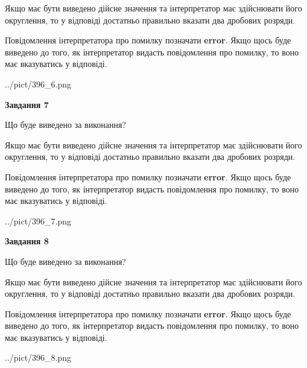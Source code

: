 \documentclass[12pt, ukrainian]{article}
\begin{document}
{\begin {Large}
Якщо має бути виведено дійсне значення та інтерпретатор має здійснювати його округлення, 
то у відповіді достатньо правильно вказати два дробових розряди.

Повідомлення інтерпретатора про помилку позначати \textbf{error}.
Якщо щось буде виведено до того, як інтерпретатор видасть повідомлення про помилку, 
то воно має вказуватись у відповіді. \par

\begin{center}
	{../pict/396_6.png}
\end{center}
\newpage

{\begin {center}\textbf{Завдання 7}\end {center}}\par
Що буде виведено за виконання? \par

Якщо має бути виведено дійсне значення та інтерпретатор має здійснювати його округлення, 
то у відповіді достатньо правильно вказати два дробових розряди.

Повідомлення інтерпретатора про помилку позначати \textbf{error}.
Якщо щось буде виведено до того, як інтерпретатор видасть повідомлення про помилку, 
то воно має вказуватись у відповіді. \par

\begin{center}
	{../pict/396_7.png}
\end{center}
\newpage

{\begin {center}\textbf{Завдання 8}\end {center}}\par
Що буде виведено за виконання? \par

Якщо має бути виведено дійсне значення та інтерпретатор має здійснювати його округлення, 
то у відповіді достатньо правильно вказати два дробових розряди.

Повідомлення інтерпретатора про помилку позначати \textbf{error}.
Якщо щось буде виведено до того, як інтерпретатор видасть повідомлення про помилку, 
то воно має вказуватись у відповіді. \par

\begin{center}
	{../pict/396_8.png}
\end{center}
\newpage


\end{Large}}
\end{document}
